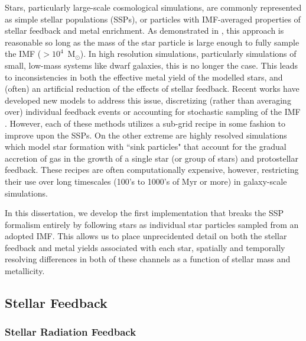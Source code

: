 Stars, particularly large-scale cosmological simulations, are commonly represented as simple stellar populations (SSPs), or particles with IMF-averaged properties of stellar feedback and metal enrichment. As demonstrated in \cite{Revaz2016}, this approach is reasonable so long as the mass of the star particle is large enough to fully sample the IMF ($> 10^{4}$~M$_{\odot}$). In high resolution simulations, particularly simulations of small, low-mass systems like dwarf galaxies, this is no longer the case. This leads to inconsistencies in both the effective metal yield of the modelled stars, and (often) an artificial reduction of the effects of stellar feedback. Recent works have developed new models to address this issue, discretizing (rather than averaging over) individual feedback events \citep[e.g.][]{MUGS2010,FIRE,Hopkins2018,Rosdahl2018} or accounting for stochastic sampling of the IMF \citep{Hu2016,Hu2017,Applebaum2018,Su2018}. However, each of these methods utilizes a sub-grid recipe in some fashion to improve upon the SSPs. On the other extreme are highly resolved simulations which model star formation with ``sink particles" \citep[see for example ][]{Krumholz2004,Federrath2010,GongOstriker2013,BleulerTeyssier2014,Sormani2017} that account for the gradual accretion of gas in the growth of a single star (or group of stars) and protostellar feedback. These recipes are often computationally expensive, however, restricting their use over long timescales (100's to 1000's of Myr or more) in galaxy-scale simulations.

In this dissertation, we develop the first implementation that breaks the SSP formalism entirely by following stars as individual star particles sampled from an adopted IMF. This allows us to place unprecidented detail on both the stellar feedback and metal yields associated with each star, spatially and temporally resolving differences in both of these channels as a function of stellar mass and metallicity.

\subsection{Stellar Feedback} \label{intro:sec:feedback}

\subsubsection{Stellar Radiation Feedback}
\label{intro:sec:radiation}

